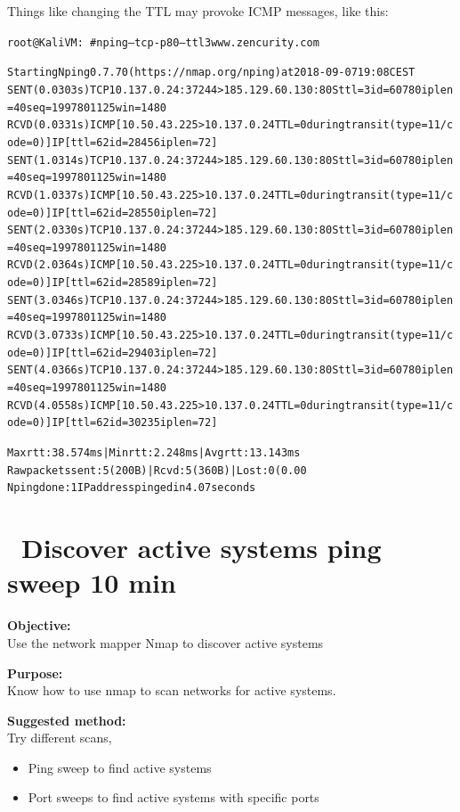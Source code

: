\documentclass[a4paper,11pt,notitlepage]{report}
\begin{document}
\eject
Things like changing the TTL may provoke ICMP messages, like this:
\begin{alltt}\footnotesize
root@KaliVM:~# nping --tcp -p 80 --ttl 3 www.zencurity.com

Starting Nping 0.7.70 ( https://nmap.org/nping ) at 2018-09-07 19:08 CEST
SENT (0.0303s) TCP 10.137.0.24:37244 > 185.129.60.130:80 S ttl=3 id=60780 iplen=40  seq=1997801125 win=1480
RCVD (0.0331s) ICMP [10.50.43.225 > 10.137.0.24 TTL=0 during transit (type=11/code=0) ] IP [ttl=62 id=28456 iplen=72 ]
SENT (1.0314s) TCP 10.137.0.24:37244 > 185.129.60.130:80 S ttl=3 id=60780 iplen=40  seq=1997801125 win=1480
RCVD (1.0337s) ICMP [10.50.43.225 > 10.137.0.24 TTL=0 during transit (type=11/code=0) ] IP [ttl=62 id=28550 iplen=72 ]
SENT (2.0330s) TCP 10.137.0.24:37244 > 185.129.60.130:80 S ttl=3 id=60780 iplen=40  seq=1997801125 win=1480
RCVD (2.0364s) ICMP [10.50.43.225 > 10.137.0.24 TTL=0 during transit (type=11/code=0) ] IP [ttl=62 id=28589 iplen=72 ]
SENT (3.0346s) TCP 10.137.0.24:37244 > 185.129.60.130:80 S ttl=3 id=60780 iplen=40  seq=1997801125 win=1480
RCVD (3.0733s) ICMP [10.50.43.225 > 10.137.0.24 TTL=0 during transit (type=11/code=0) ] IP [ttl=62 id=29403 iplen=72 ]
SENT (4.0366s) TCP 10.137.0.24:37244 > 185.129.60.130:80 S ttl=3 id=60780 iplen=40  seq=1997801125 win=1480
RCVD (4.0558s) ICMP [10.50.43.225 > 10.137.0.24 TTL=0 during transit (type=11/code=0) ] IP [ttl=62 id=30235 iplen=72 ]

Max rtt: 38.574ms | Min rtt: 2.248ms | Avg rtt: 13.143ms
Raw packets sent: 5 (200B) | Rcvd: 5 (360B) | Lost: 0 (0.00%
Nping done: 1 IP address pinged in 4.07 seconds
\end{alltt}


\chapter{\faInfoCircle\ Discover active systems ping sweep 10 min}
\label{ex:nmap-pingsweep}

{\bf Objective:}\\
Use the network mapper Nmap to discover active systems

{\bf Purpose:}\\
Know how to use nmap to scan networks for active systems.

{\bf Suggested method:}\\
Try different scans,
\begin{itemize}
\item Ping sweep to find active systems
\item Port sweeps to find active systems with specific ports
\end{itemize}
\end{document}
